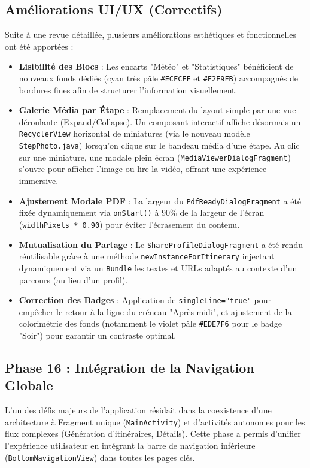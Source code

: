 \documentclass{article}
\begin{document}
\subsection{Améliorations UI/UX (Correctifs)}
Suite à une revue détaillée, plusieurs améliorations esthétiques et fonctionnelles ont été apportées :
\begin{itemize}
    \item \textbf{Lisibilité des Blocs} : Les encarts "Météo" et "Statistiques" bénéficient de nouveaux fonds dédiés (cyan très pâle \texttt{\#ECFCFF} et \texttt{\#F2F9FB}) accompagnés de bordures fines afin de structurer l'information visuellement.
    \item \textbf{Galerie Média par Étape} : Remplacement du layout simple par une vue déroulante (Expand/Collapse). Un composant interactif affiche désormais un \texttt{RecyclerView} horizontal de miniatures (via le nouveau modèle \texttt{StepPhoto.java}) lorsqu'on clique sur le bandeau média d'une étape. Au clic sur une miniature, une modale plein écran (\texttt{MediaViewerDialogFragment}) s'ouvre pour afficher l'image ou lire la vidéo, offrant une expérience immersive.
    \item \textbf{Ajustement Modale PDF} : La largeur du \texttt{PdfReadyDialogFragment} a été fixée dynamiquement via \texttt{onStart()} à 90\% de la largeur de l'écran (\texttt{widthPixels * 0.90}) pour éviter l'écrasement du contenu.
    \item \textbf{Mutualisation du Partage} : Le \texttt{ShareProfileDialogFragment} a été rendu réutilisable grâce à une méthode \texttt{newInstanceForItinerary} injectant dynamiquement via un \texttt{Bundle} les textes et URLs adaptés au contexte d'un parcours (au lieu d'un profil).
    \item \textbf{Correction des Badges} : Application de \texttt{singleLine="true"} pour empêcher le retour à la ligne du créneau "Après-midi", et ajustement de la colorimétrie des fonds (notamment le violet pâle \texttt{\#EDE7F6} pour le badge "Soir") pour garantir un contraste optimal.
\end{itemize}

\subsection{Phase 16 : Intégration de la Navigation Globale}
L'un des défis majeurs de l'application résidait dans la coexistence d'une architecture à Fragment unique (\texttt{MainActivity}) et d'activités autonomes pour les flux complexes (Génération d'itinéraires, Détails). Cette phase a permis d'unifier l'expérience utilisateur en intégrant la barre de navigation inférieure (\texttt{BottomNavigationView}) dans toutes les pages clés.
\end{document}
